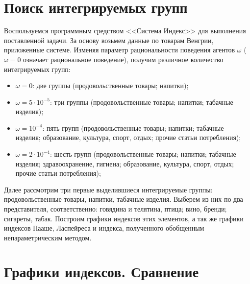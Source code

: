 \documentclass[10pt, a4paper]{article}
\begin{document}
\section{Поиск интегрируемых групп}
Воспользуемся программным средством <<Система Индекс>> для выполнения поставленной задачи. За основу возьмем данные по товарам Венгрии, приложенные системе. Изменяя параметр рациональности поведения агентов $\omega$ ($\omega = 0$ означает рациональное поведение), получим различное количество интегрируемых групп:
\begin{itemize}
\item $\omega=0$: две группы (продовольственные товары; напитки);
\item $\omega=5\cdot 10^{-5}$: три группы (продовольственные товары; напитки; табачные изделия);
\item $\omega=10^{-4}$: пять групп (продовольственные товары; напитки; табачные изделия; образование, культура, спорт, отдых; прочие статьи потребления);
\item $\omega=2\cdot 10^{-4}$: шесть групп (продовольственные товары; напитки; табачные изделия; здравоохранение, гигиена; образование, культура, спорт, отдых; прочие статьи потребления);
\end{itemize}

Далее рассмотрим три первые выделившиеся интегрируемые группы: продовольственные товары, напитки, табачные изделия. Выберем из них по два представителя, соответственно: говядина и телятина, птица; вино, бренди; сигареты, табак. Построим графики индексов этих элементов, а так же графики индексов Пааше, Ласпейреса и индекса, полученного обобщенным непараметрическим методом.

\newpage
\section{Графики индексов. Сравнение}
\end{document}
